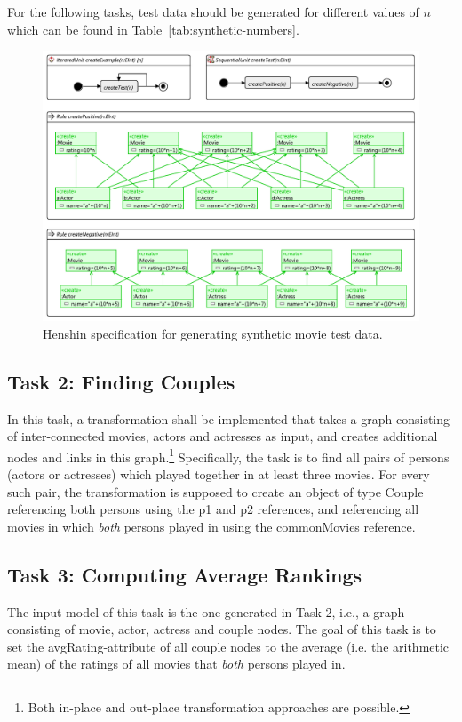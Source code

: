 \documentclass[a4paper,11pt]{article}
\newcommand{\p}[1]{\textsf{\small #1}}
\begin{document}
For the following tasks, test data should be generated for different values 
of $n$ which can be found in Table~\ref{tab:synthetic-numbers}.


\begin{figure}[p]
\centering
\includegraphics[scale=1.0,angle=90]{gen-test-data3}
\caption{Henshin specification for generating synthetic movie test data.}
\label{fig:gen-test-data}
\end{figure}

\subsection{Task 2: Finding Couples}

In this task, a transformation shall be implemented that takes a graph
consisting of inter-connected movies, actors and actresses as input, and
creates additional nodes and links in this graph.\footnote{Both in-place and
  out-place transformation approaches are possible.} Specifically, the task is
to find all pairs of persons (actors or actresses) which played together in at
least three movies.  For every such pair, the transformation is supposed to
create an object of type \p{Couple} referencing both persons using the
\p{p1} and \p{p2} references, and referencing all movies in which
\emph{both} persons played in using the \p{commonMovies} reference.

\subsection{Task 3: Computing Average Rankings}

The input model of this task is the one generated in Task 2,
i.e., a graph consisting of movie, actor, actress and couple
nodes. The goal of this task is to set the \p{avgRating}-attribute
of all couple nodes to the average (i.e. the
arithmetic mean) of the ratings of all movies that
\emph{both} persons played in.
\end{document}
